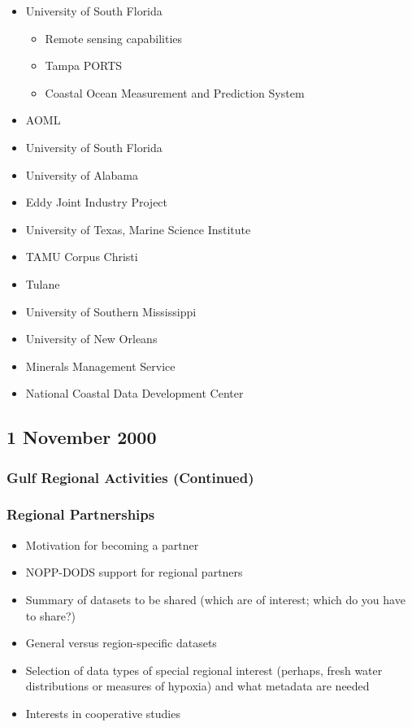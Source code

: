 \begin{itemize}
\item     University of South Florida
  \begin{itemize}
  \item Remote sensing capabilities
  \item Tampa PORTS
  \item Coastal Ocean Measurement and Prediction System
  \end{itemize}
\item     AOML
\item     University of South Florida
\item     University of Alabama
\item     Eddy Joint Industry Project
\item     University of Texas, Marine Science Institute
\item     TAMU Corpus Christi
\item     Tulane
\item     University of Southern Mississippi
\item     University of New Orleans
\item     Minerals Management Service
\item     National Coastal Data Development Center
\end{itemize}

\subsection{1 November 2000}

\subsubsection{Gulf Regional Activities (Continued)}

\subsubsection{Regional Partnerships}
\begin{itemize}
\item     Motivation for becoming a partner
\item     NOPP-DODS support for regional partners
\item     Summary of datasets to be shared (which are of interest; which do you have to share?)
\item     General versus region-specific datasets
\item     Selection of data types of special regional interest (perhaps, fresh water distributions or 
measures of hypoxia) and what metadata are needed
\item     Interests in cooperative studies
\end{itemize}


